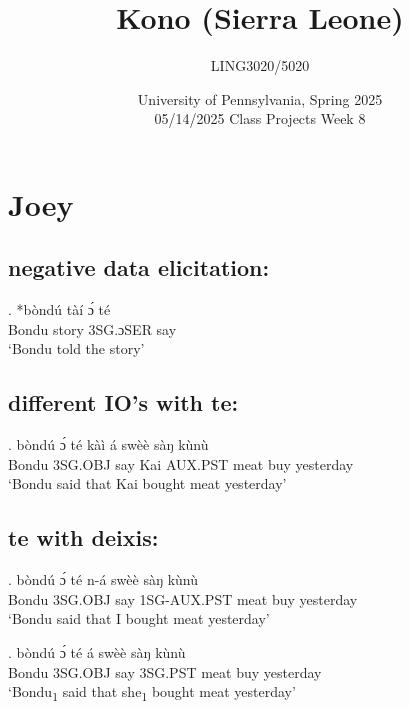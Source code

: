 \documentclass{assets/fieldnotes}
\title{Kono (Sierra Leone)}
\author{LING3020/5020}
\date{University of Pennsylvania, Spring 2025\\05/14/2025 Class Projects Week 8}
\begin{document}
\maketitle

\maketitle
\tableofcontents


\section{Joey}

\subsection{negative data elicitation:}

\exg. *bòndú  tàí ɔ́ té\\
Bondu story 3SG.ɔSER say\\
`Bondu told the story' 

\subsection{different IO's with te:}

\exg. bòndú ɔ́ té kàì á swèè sàŋ kùnù\\
Bondu 3SG.OBJ say Kai AUX.PST meat buy yesterday\\
`Bondu said that Kai bought meat yesterday' 


\subsection{te with deixis:}

\exg. bòndú ɔ́ té n-á swèè sàŋ kùnù\\
Bondu 3SG.OBJ say 1SG-AUX.PST meat buy yesterday\\
`Bondu said that I bought meat yesterday' 


\exg. bòndú ɔ́ té á swèè sàŋ kùnù\\
Bondu 3SG.OBJ say 3SG.PST meat buy yesterday\\
`Bondu\textsubscript{1} said that she\textsubscript{1}  bought meat yesterday' 
\end{document}

